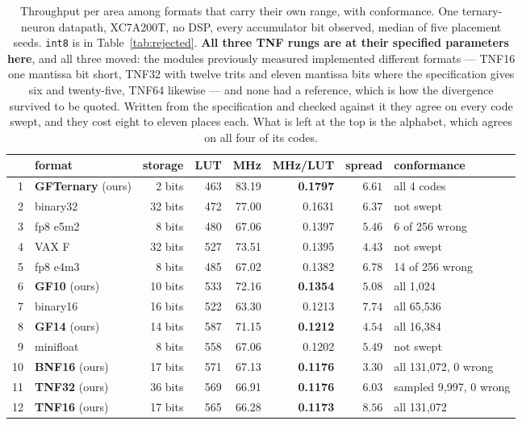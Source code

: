 \documentclass[11pt]{article}
\theoremstyle{definition}
\begin{document}
\begin{table}[t]\centering
\caption{Throughput per area among formats that carry their own range, with
conformance. One ternary-neuron datapath, XC7A200T, no DSP, every accumulator
bit observed, median of five placement seeds. \texttt{int8} is in
Table~\ref{tab:rejected}. \textbf{All three TNF rungs are at their specified
parameters here}, and all three moved: the modules previously measured
implemented different formats --- TNF16 one mantissa bit short, TNF32 with twelve
trits and eleven mantissa bits where the specification gives six and
twenty-five, TNF64 likewise --- and none had a reference, which is how the
divergence survived to be quoted. Written from the specification and checked
against it they agree on every code swept, and they cost eight to eleven places
each. What is left at the top is the alphabet, which agrees on all four of its
codes.}
\label{tab:fullthroughput}
\small
\begin{tabular}{rlrrrrrl}
\toprule
& format & storage & LUT & MHz & MHz/LUT & spread & conformance \\
\midrule
1 & \textbf{GFTernary} (ours) & 2 bits & 463 & 83.19 & \textbf{0.1797} & $6.61$ & all 4 codes \\
2 & binary32 & 32 bits & 472 & 77.00 & 0.1631 & $6.37$ & not swept \\
3 & fp8 e5m2 & 8 bits & 480 & 67.06 & 0.1397 & $5.46$ & 6 of 256 wrong \\
4 & VAX F & 32 bits & 527 & 73.51 & 0.1395 & $4.43$ & not swept \\
5 & fp8 e4m3 & 8 bits & 485 & 67.02 & 0.1382 & $6.78$ & 14 of 256 wrong \\
6 & \textbf{GF10} (ours) & 10 bits & 533 & 72.16 & \textbf{0.1354} & $5.08$ & all 1{,}024 \\
7 & binary16 & 16 bits & 522 & 63.30 & 0.1213 & $7.74$ & all 65{,}536 \\
8 & \textbf{GF14} (ours) & 14 bits & 587 & 71.15 & \textbf{0.1212} & $4.54$ & all 16{,}384 \\
9 & minifloat & 8 bits & 558 & 67.06 & 0.1202 & $5.49$ & not swept \\
10 & \textbf{BNF16} (ours) & 17 bits & 571 & 67.13 & \textbf{0.1176} & $3.30$ & all 131{,}072, 0 wrong \\
11 & \textbf{TNF32} (ours) & 36 bits & 569 & 66.91 & \textbf{0.1176} & $6.03$ & sampled 9{,}997, 0 wrong \\
12 & \textbf{TNF16} (ours) & 17 bits & 565 & 66.28 & \textbf{0.1173} & $8.56$ & all 131{,}072 \\

\end{tabular}
\end{table}
\end{document}
